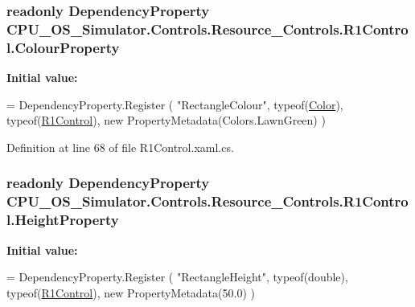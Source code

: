 \subsubsection[{Colour\+Property}]{\setlength{\rightskip}{0pt plus 5cm}readonly Dependency\+Property C\+P\+U\+\_\+\+O\+S\+\_\+\+Simulator.\+Controls.\+Resource\+\_\+\+Controls.\+R1\+Control.\+Colour\+Property\hspace{0.3cm}{\ttfamily [static]}}\label{class_c_p_u___o_s___simulator_1_1_controls_1_1_resource___controls_1_1_r1_control_aa778bafc6af7a12101c6809551838fd1}
{\bfseries Initial value\+:}
\begin{DoxyCode}
= DependencyProperty.Register
        (
            \textcolor{stringliteral}{"RectangleColour"},
            typeof(\hyperlink{namespace_color}{Color}),
            typeof(\hyperlink{class_c_p_u___o_s___simulator_1_1_controls_1_1_resource___controls_1_1_r1_control_af02c55b4fcbf6baa5c8f4a49cafaaa84}{R1Control}),
            \textcolor{keyword}{new} PropertyMetadata(Colors.LawnGreen)
        )
\end{DoxyCode}


Definition at line 68 of file R1\+Control.\+xaml.\+cs.

\hypertarget{class_c_p_u___o_s___simulator_1_1_controls_1_1_resource___controls_1_1_r1_control_afe99fcf8276ab5c238fa7456413ff4be}{}
\subsubsection[{Height\+Property}]{\setlength{\rightskip}{0pt plus 5cm}readonly Dependency\+Property C\+P\+U\+\_\+\+O\+S\+\_\+\+Simulator.\+Controls.\+Resource\+\_\+\+Controls.\+R1\+Control.\+Height\+Property\hspace{0.3cm}{\ttfamily [static]}}\label{class_c_p_u___o_s___simulator_1_1_controls_1_1_resource___controls_1_1_r1_control_afe99fcf8276ab5c238fa7456413ff4be}
{\bfseries Initial value\+:}
\begin{DoxyCode}
= DependencyProperty.Register
        (
            \textcolor{stringliteral}{"RectangleHeight"},
            typeof(\textcolor{keywordtype}{double}),
            typeof(\hyperlink{class_c_p_u___o_s___simulator_1_1_controls_1_1_resource___controls_1_1_r1_control_af02c55b4fcbf6baa5c8f4a49cafaaa84}{R1Control}),
            \textcolor{keyword}{new} PropertyMetadata(50.0)
        )
\end{DoxyCode}


